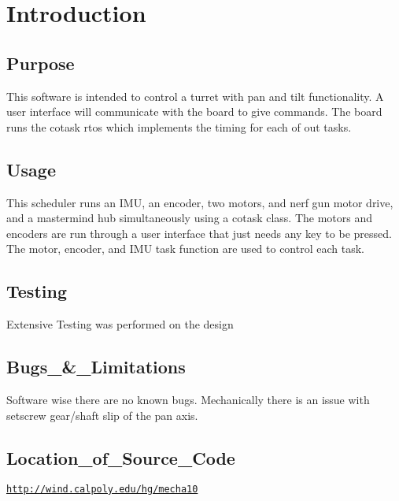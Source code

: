 \hypertarget{index_intro}{}\section{Introduction}\label{index_intro}
\hypertarget{index_purpose}{}\subsection{Purpose}\label{index_purpose}
This software is intended to control a turret with pan and tilt functionality. A user interface will communicate with the board to give commands. The board runs the cotask rtos which implements the timing for each of out tasks. \hypertarget{index_usage}{}\subsection{Usage}\label{index_usage}
This scheduler runs an I\+MU, an encoder, two motors, and nerf gun motor drive, and a mastermind hub simultaneously using a cotask class. The motors and encoders are run through a user interface that just needs any key to be pressed. The motor, encoder, and I\+MU task function are used to control each task. \hypertarget{index_testing}{}\subsection{Testing}\label{index_testing}
Extensive Testing was performed on the design \hypertarget{index_bugs}{}\subsection{Bugs\+\_\+\&\+\_\+\+Limitations}\label{index_bugs}
Software wise there are no known bugs. Mechanically there is an issue with setscrew gear/shaft slip of the pan axis. \hypertarget{index_location}{}\subsection{Location\+\_\+of\+\_\+\+Source\+\_\+\+Code}\label{index_location}
\href{http://wind.calpoly.edu/hg/mecha10}{\tt http\+://wind.\+calpoly.\+edu/hg/mecha10} 